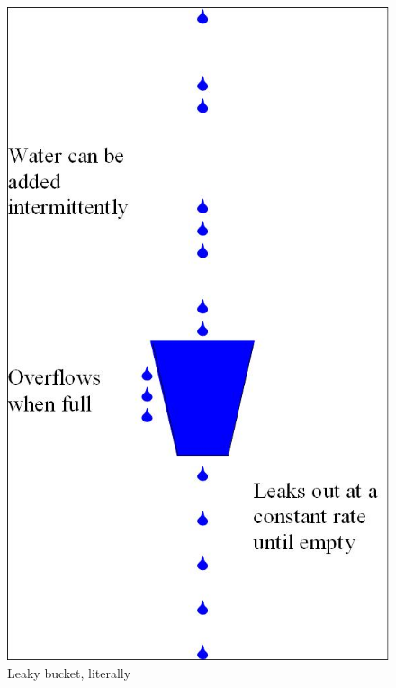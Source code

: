 \documentclass[10pt,pdf,hyperref={unicode}]{beamer}
\begin{document}
\begin{frame}
    \begin{figure}[h]
        \begin{center}
            \includegraphics[height=0.8\textheight]{leaky_bucket_analogy.jpg}
        \end{center}
        \caption{Leaky bucket, literally}
        \label{fig:leaky_bucket}
    \end{figure}
\end{frame}
\end{document}
